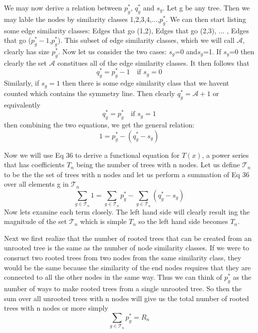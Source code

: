 \documentclass{article}
\begin{document}
We may now derive a relation between \(p_g^*\), \(q_g^*\) and \(s_g\). Let g be any tree. Then we may lable the nodes by similarity classes 1,2,3,4,...,\(p_g^*\). We can then start listing some edge similarity classes: Edges that go (1,2), Edges that go (2,3), ... , Edges that go (\(p_g^*-1\),\(p_g^*\)). This subset of edge similarity classes, which we will call \(\mathscr{A}\), clearly has size \(p_g^*\). Now let us consider the two cases: \(s_g\)=0 and\( s_g\)=1. If \(s_g\)=0 then clearly the set \(\mathscr{A}\) constitues all of the edge similarity classes. It then follows that 
\begin{equation}
q_g^*=p_g^*-1\quad  \text{if } s_g =0
\end{equation}
	Similarly, if \(s_g=1\) then there is some edge similarity class that we havent counted which contains the symmetry line. Then clearly \(q_g^*= \mathscr{A}+1\) or equivalently
\begin{equation}
q_g^*=p_g^* \quad \text{if } s_g =1
\end{equation}
then combining the two equations, we get the general relation:
\begin{equation}
1=p_g^*-(q_g^*-s_g)
\end{equation}

Now we will use Eq 36 to derive a functional equation for \(T(x)\), a power series that has coefficients \(T_n\) being the number of trees with n nodes. Let us define \(\mathscr{T}_n\) to be the the set of trees with n nodes and let us perform a summation of Eq 36 over all elements g in \(\mathscr{T}_n\)
\begin{equation}
\sum_{g \in \mathscr{T}_n} 1=\sum_{g \in \mathscr{T}_n}p_g^*- \sum_{g \in \mathscr{T}_n}(q_g^*-s_g)
\end{equation}
Now lets examine each term closely. The left hand side will clearly result ing the magnitude of the set \(\mathscr{T}_n\) which is simple \(T_n\) so the left hand side becomes \(T_n\).

Next we first realize that the number of rooted trees that can be created from an unrooted tree is the same as the number of node similarity classes. If we were to consruct two rooted trees from two nodes from the same similarity class, they would be the same because the similarity of the end nodes requires that they are connected to all the other nodes in the same way. Thus we can think of \(p_g^*\) as the number of ways to make rooted trees from a single unrooted tree. So then the sum over all unrooted trees with n nodes will give us the total number of rooted trees with n nodes or more simply
\begin{equation}
\sum_{g \in \mathscr{T}_n}p_g^*=R_n
\end{equation}
\end{document}
